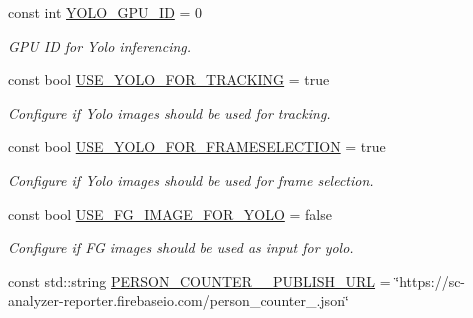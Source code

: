 \begin{DoxyCompactItemize}
\mbox{\label{namespacedto_1_1_configuration_a58483f10119ffc862f9d6e2e22dba470}} 
const int \mbox{\hyperlink{namespacedto_1_1_configuration_a58483f10119ffc862f9d6e2e22dba470}{Y\+O\+L\+O\+\_\+\+G\+P\+U\+\_\+\+ID}} = 0
\begin{DoxyCompactList}\small\item\em G\+PU ID for Yolo inferencing. \end{DoxyCompactList}\item 
\mbox{\label{namespacedto_1_1_configuration_a9b7c94b8a8b733ed6662ccc6778d23f4}} 
const bool \mbox{\hyperlink{namespacedto_1_1_configuration_a9b7c94b8a8b733ed6662ccc6778d23f4}{U\+S\+E\+\_\+\+Y\+O\+L\+O\+\_\+\+F\+O\+R\+\_\+\+T\+R\+A\+C\+K\+I\+NG}} = true
\begin{DoxyCompactList}\small\item\em Configure if Yolo images should be used for tracking. \end{DoxyCompactList}\item 
\mbox{\label{namespacedto_1_1_configuration_a25c9f2c765e48c9f006cc7f80b1ae73c}} 
const bool \mbox{\hyperlink{namespacedto_1_1_configuration_a25c9f2c765e48c9f006cc7f80b1ae73c}{U\+S\+E\+\_\+\+Y\+O\+L\+O\+\_\+\+F\+O\+R\+\_\+\+F\+R\+A\+M\+E\+S\+E\+L\+E\+C\+T\+I\+ON}} = true
\begin{DoxyCompactList}\small\item\em Configure if Yolo images should be used for frame selection. \end{DoxyCompactList}\item 
\mbox{\label{namespacedto_1_1_configuration_a50e36ded79f69f6dc4e25cbfad6fccba}} 
const bool \mbox{\hyperlink{namespacedto_1_1_configuration_a50e36ded79f69f6dc4e25cbfad6fccba}{U\+S\+E\+\_\+\+F\+G\+\_\+\+I\+M\+A\+G\+E\+\_\+\+F\+O\+R\+\_\+\+Y\+O\+LO}} = false
\begin{DoxyCompactList}\small\item\em Configure if FG images should be used as input for yolo. \end{DoxyCompactList}\item 
\mbox{\label{namespacedto_1_1_configuration_a849167aa3f77490be03741b3cbe02c8f}} 
const std\+::string \mbox{\hyperlink{namespacedto_1_1_configuration_a849167aa3f77490be03741b3cbe02c8f}{P\+E\+R\+S\+O\+N\+\_\+\+C\+O\+U\+N\+T\+E\+R\+\_\+\_\+\+P\+U\+B\+L\+I\+S\+H\+\_\+\+U\+RL}} = \char`\"{}https\+://sc-\/analyzer-\/reporter.\+firebaseio.\+com/person\+\_\+counter\+\_.\+json\char`\"{}

\end{DoxyCompactItemize}
